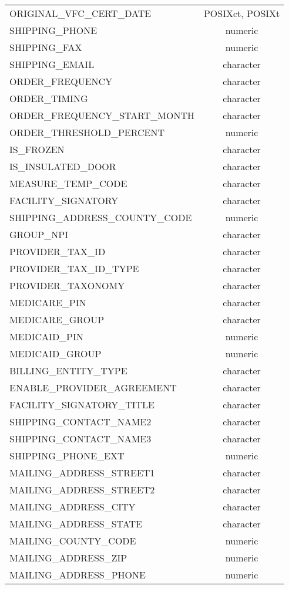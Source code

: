 \documentclass[
  letterpaper,
  DIV=11,
  numbers=noendperiod]{scrreprt}
\begin{document}
\begin{longtable}{lc}
ORIGINAL\_VFC\_CERT\_DATE & POSIXct, POSIXt \\ 
SHIPPING\_PHONE & numeric \\ 
SHIPPING\_FAX & numeric \\ 
SHIPPING\_EMAIL & character \\ 
ORDER\_FREQUENCY & character \\ 
ORDER\_TIMING & character \\ 
ORDER\_FREQUENCY\_START\_MONTH & character \\ 
ORDER\_THRESHOLD\_PERCENT & numeric \\ 
IS\_FROZEN & character \\ 
IS\_INSULATED\_DOOR & character \\ 
MEASURE\_TEMP\_CODE & character \\ 
FACILITY\_SIGNATORY & character \\ 
SHIPPING\_ADDRESS\_COUNTY\_CODE & numeric \\ 
GROUP\_NPI & character \\ 
PROVIDER\_TAX\_ID & character \\ 
PROVIDER\_TAX\_ID\_TYPE & character \\ 
PROVIDER\_TAXONOMY & character \\ 
MEDICARE\_PIN & character \\ 
MEDICARE\_GROUP & character \\ 
MEDICAID\_PIN & numeric \\ 
MEDICAID\_GROUP & numeric \\ 
BILLING\_ENTITY\_TYPE & character \\ 
ENABLE\_PROVIDER\_AGREEMENT & character \\ 
FACILITY\_SIGNATORY\_TITLE & character \\ 
SHIPPING\_CONTACT\_NAME2 & character \\ 
SHIPPING\_CONTACT\_NAME3 & character \\ 
SHIPPING\_PHONE\_EXT & numeric \\ 
MAILING\_ADDRESS\_STREET1 & character \\ 
MAILING\_ADDRESS\_STREET2 & character \\ 
MAILING\_ADDRESS\_CITY & character \\ 
MAILING\_ADDRESS\_STATE & character \\ 
MAILING\_COUNTY\_CODE & numeric \\ 
MAILING\_ADDRESS\_ZIP & numeric \\ 
MAILING\_ADDRESS\_PHONE & numeric \\ 

\end{longtable}
\end{document}

